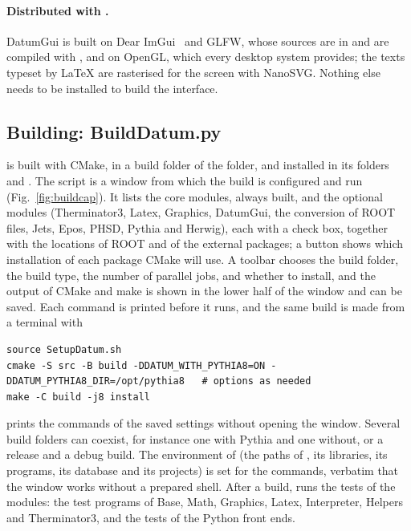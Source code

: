 \paragraph{Distributed with \Datum{}.}
DatumGui is built on Dear ImGui~\cite{DearImGui} and GLFW, whose sources are in  and are compiled with
\Datum{}, and on OpenGL, which every desktop system provides; the texts typeset by LaTeX are rasterised for the screen with NanoSVG. Nothing else needs to be
installed to build the interface.

\subsection{Building: BuildDatum.py}
\label{sec:build}

\Datum{} is built with CMake, in a build folder of the \Datum{} folder, and installed in its folders  and
. The script  is a window from which the build is configured and run (Fig.~\ref{fig:buildcap}).
It lists the core modules, always built, and the optional modules (Therminator3, Latex, Graphics, DatumGui, the
conversion of ROOT files, Jets, Epos, PHSD, Pythia and Herwig), each with a check box, together with the locations of ROOT and of
the external packages; a button shows which installation of each package CMake will use. A toolbar chooses the build
folder, the build type, the number of parallel jobs, and whether to install, and the output of CMake and make is shown
in the lower half of the window and can be saved. Each command is printed before it runs, and the same build is made
from a terminal with
\begin{verbatim}
source SetupDatum.sh
cmake -S src -B build -DDATUM_WITH_PYTHIA8=ON -DDATUM_PYTHIA8_DIR=/opt/pythia8   # options as needed
make -C build -j8 install
\end{verbatim}
 prints the commands of the saved settings without opening the window. Several build
folders can coexist, for instance one with Pythia and one without, or a release and a debug build. The environment
of  (the paths of \Datum{}, its libraries, its programs, its database and its projects) is set for the
commands, verbatim that the window works without a prepared shell. After a build,  runs the tests of the
modules: the test programs of Base, Math, Graphics, Latex, Interpreter, Helpers and Therminator3, and the tests of
the Python front ends.



